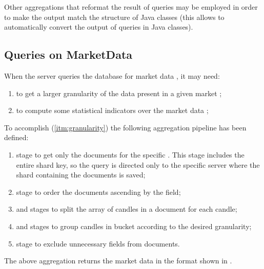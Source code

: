 Other aggregations that reformat the result of queries may be employed in order
to make the output match the structure of Java classes (this allows \mongodb{}
to automatically convert the output of queries in  Java classes).

\subsection{Queries on MarketData}\label{subsec:marketdata-aggregations}

When the server queries the database for market data , it may need:
\begin{enumerate}
	\item\label{itm:granularity} to get a larger granularity of the data
		present in a given market ;
	\item\label{itm:indicators} to compute some statistical indicators over
		the market data ;
\end{enumerate}

To accomplish (\ref{itm:granularity}) the following aggregation pipeline has
been defined:
\begin{enumerate}
	\item {} stage to get only the documents for the specific
		. This stage includes the entire shard key, so the
		query is directed only to the specific server where the shard
		containing the documents is saved;
	\item {} stage to order the documents ascending by the
		 field;
	\item {} and  stages to split the array
		of candles in a document for each candle;
	\item {} and  stages to group candles in
		bucket according to the desired granularity;
	\item {} stage to exclude unnecessary fields from
		documents.
\end{enumerate}

The above aggregation returns the market data in the format shown in
.



